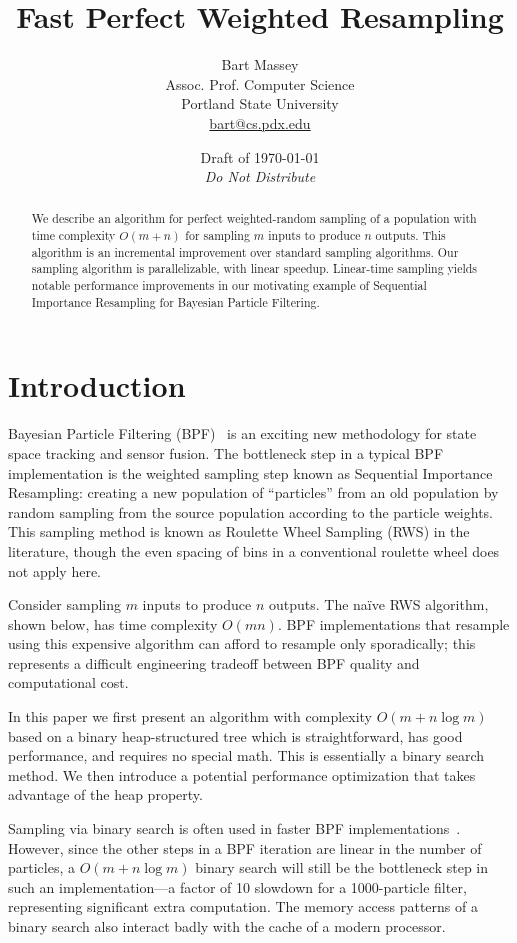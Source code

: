 \documentclass[12pt]{article}
\title{Fast Perfect Weighted Resampling}
\author{Bart Massey\\
  Assoc. Prof. Computer Science\\
  Portland State University\\
  \url{bart@cs.pdx.edu}}
\date{Draft of \today\\{\em Do Not Distribute}}
\begin{document}
  \maketitle

  \begin{abstract}
  We describe an algorithm for perfect weighted-random
  sampling of a population with time complexity $O(m +
  n)$ for sampling $m$ inputs to produce $n$ outputs.
  This algorithm is an incremental improvement over
  standard sampling algorithms.  Our sampling
  algorithm is parallelizable, with linear speedup.
  Linear-time sampling yields notable performance
  improvements in our motivating example of Sequential
  Importance Resampling for Bayesian
  Particle Filtering.
  \end{abstract}

\section{Introduction}
  Bayesian Particle Filtering (BPF)~\cite{bpf} is an exciting
  new methodology for state space tracking and sensor
  fusion.  The bottleneck step in a typical BPF
  implementation is the weighted sampling step known as
  Sequential Importance Resampling: creating a new
  population of ``particles'' from an old population by
  random sampling from the source population according to
  the particle weights.  This sampling method is known as
  Roulette Wheel Sampling (RWS) in the literature, though
  the even spacing of bins in a conventional roulette wheel
  does not apply here.

  Consider sampling $m$ inputs to produce $n$ outputs.
  The na\"ive RWS algorithm, shown below, has time
  complexity $O(mn)$.  BPF implementations that resample
  using this expensive algorithm can afford to resample only
  sporadically; this represents a difficult engineering
  tradeoff between BPF quality and computational cost.

  In this paper we first present an algorithm with
  complexity $O(m + n \log m)$ based on a binary
  heap-structured tree which is straightforward, has good
  performance, and requires no special math.  This is
  essentially a binary search method.  We then introduce a
  potential performance optimization that takes advantage of
  the heap property.

  Sampling via binary search is often used in faster BPF
  implementations~\cite{arulampalam02tutorial}.  However,
  since the other steps in a BPF iteration are linear in the
  number of particles, a $O(m + n \log m)$ binary search
  will still be the bottleneck step in such an
  implementation---a factor of 10 slowdown for a 1000-particle
  filter, representing significant extra computation.  The
  memory access patterns of a binary search also interact
  badly with the cache of a modern processor.
\end{document}
